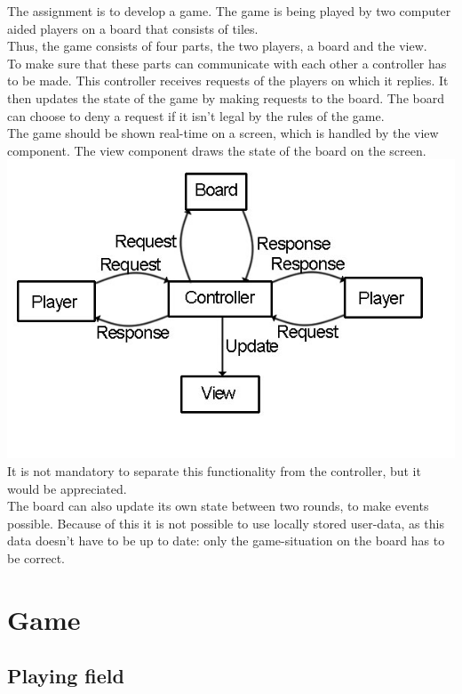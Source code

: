 \documentclass[12pt]{article}
\begin{document}
The assignment is to develop a game. The game is being played by two computer 
aided players on a board that consists of tiles. \\
Thus, the game consists of four parts, the two players, a board and the view.\\
To make sure that these parts can communicate with each other a controller has 
to be made. This controller receives requests of the players on which it replies. 
It then updates the state of the game by making requests to the board. 
The board can choose to deny a request if it isn't legal by the rules of the game.\\
The game should be shown real-time on a screen, which is handled by the view component. 
The view component draws the state of the board on the screen.\\
\includegraphics[width=\linewidth]{plaatje-2a}
It is not mandatory to separate this functionality from the controller, 
but it would be appreciated.\\
The board can also update its own state between two rounds, to make events possible. 
Because of this it is not possible to use locally stored user-data, as this data 
doesn't have to be up to date: only the game-situation on the board has to be correct.\\


\section{Game}

\subsection{Playing field}
\end{document}
